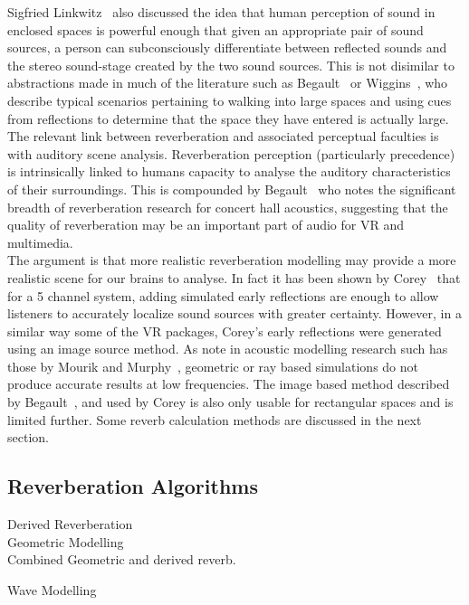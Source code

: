 \documentclass[paper=a4, fontsize=10pt, font=arial]{scrartcl} %
\numberwithin{equation}{section} %
\numberwithin{figure}{section} %
\numberwithin{table}{section} %
\begin{document}
Sigfried Linkwitz~\cite{Linkwitz2015} also discussed the idea that human perception of sound in enclosed spaces is powerful enough that given an appropriate pair of sound sources, a person can subconsciously differentiate between reflected sounds and the stereo sound-stage created by the two sound sources. This is not disimilar to abstractions made in much of the literature such as Begault~\cite{Begault1995} or Wiggins~\cite{Wiggins2004}, who describe typical scenarios pertaining to walking into large spaces and using cues from reflections to determine that the space they have entered is actually large. The relevant link between reverberation and associated perceptual faculties is with auditory scene analysis. Reverberation perception (particularly precedence) is intrinsically linked to humans capacity to analyse the auditory characteristics of their surroundings. This is compounded by Begault~\cite{Begault1995} who notes the significant breadth of reverberation research for concert hall acoustics, suggesting that the quality of reverberation may be an important part of audio for VR and multimedia.\\ 
The argument is that more realistic reverberation modelling may provide a more realistic scene for our brains to analyse. In fact it has been shown by Corey~\cite{Corey2002} that for a 5 channel system, adding simulated early reflections are enough to allow listeners to accurately localize sound sources with greater certainty. However, in a similar way some of the VR packages, Corey's early reflections were generated using an image source method. As note in acoustic modelling research such has those by Mourik and Murphy~\cite{Mourik2013}, geometric or ray based simulations do not produce accurate results at low frequencies. The image based method described by Begault~\cite{Begault1995}, and used by Corey is also only usable for rectangular spaces and is limited further. Some reverb calculation methods are discussed in the next section.

\subsection{Reverberation Algorithms}

Derived Reverberation\\

Geometric Modelling\\

Combined Geometric and derived reverb.

Wave Modelling\\
\end{document}
